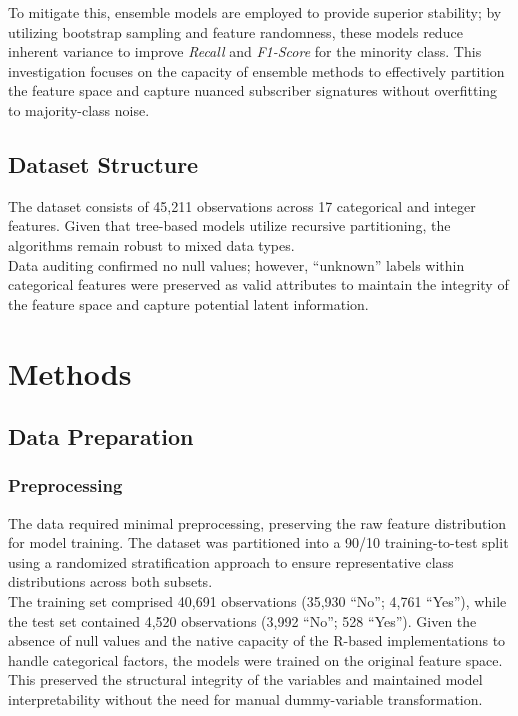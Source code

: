 \documentclass[conference]{IEEEtran}
\begin{document}
To mitigate this, ensemble models are employed to provide superior stability; by utilizing bootstrap sampling and feature randomness, these models reduce inherent variance to improve \textit{Recall} and \textit{F1-Score} for the minority class. This investigation focuses on the capacity of ensemble methods to effectively partition the feature space and capture nuanced subscriber signatures without overfitting to majority-class noise.

\subsection{\textbf{Dataset Structure}}
\indent The dataset \cite{moro2014} consists of 45,211 observations across 17 categorical and integer features. Given that tree-based models utilize recursive partitioning, the algorithms remain robust to mixed data types.\\
\indent Data auditing confirmed no null values; however, ``unknown'' labels within categorical features were preserved as valid attributes to maintain the integrity of the feature space and capture potential latent information. \\

\section{\textbf{Methods}}

\subsection{\textbf{Data Preparation}}

\subsubsection*{\textbf{Preprocessing}}
The data required minimal preprocessing, preserving the raw feature distribution for model training. The dataset was partitioned into a 90/10 training-to-test split using a randomized stratification approach to ensure representative class distributions across both subsets.\\ 
\indent The training set comprised 40,691 observations (35,930 ``No''; 4,761 ``Yes''), while the test set contained 4,520 observations (3,992 ``No''; 528 ``Yes''). Given the absence of null values and the native capacity of the R-based implementations to handle categorical factors, the models were trained on the original feature space. This preserved the structural integrity of the variables and maintained model interpretability without the need for manual dummy-variable transformation.
\end{document}
